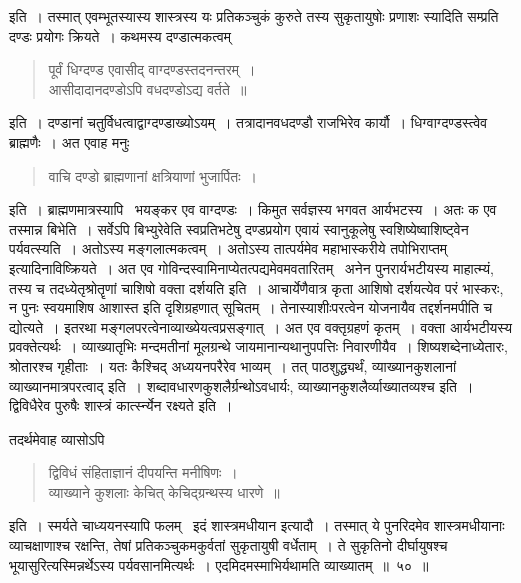 \documentclass[11pt, openany]{book}
\begin{document}
\newpage


\noindent इति~। तस्मात् एवम्भूतस्यास्य शास्त्रस्य यः प्रतिकञ्चुकं कुरुते तस्य सुकृतायुषोः प्रणाशः स्यादिति सम्प्रति दण्डः प्रयोगः क्रियते~। कथमस्य दण्डात्मकत्वम्\textendash 

\begin{quote}
{\qt पूर्वं धिग्दण्ड एवासीद् वाग्दण्डस्तदनन्तरम्~।\\
आसीदादानदण्डोऽपि वधदण्डोऽद्य वर्तते~॥}
\end{quote}

\noindent इति~। दण्डानां चतुर्विधत्वाद्वाग्दण्डाख्योऽयम्~। तत्रादानवधदण्डौ राजभिरेव कार्यौ~। धिग्वाग्दण्डस्त्वेव ब्राह्मणैः~। अत एवाह मनुः\textendash  
\begin{quote}
{\qt वाचि दण्डो ब्राह्मणानां क्षत्रियाणां भुजार्पितः~।}
\end{quote} 

\noindent इति~। ब्राह्मणमात्रस्यापि \textendash\ भयङ्कर एव वाग्दण्डः~। किमुत सर्वज्ञस्य भगवत आर्यभटस्य~। अतः क एव तस्मान्न बिभेति~। सर्वेऽपि बिभ्युरेवेति स्वप्रतिभटेषु दण्डप्रयोग एवायं स्वानुकूलेषु स्वशिष्येष्वाशिष्ट्वेन पर्यवत्स्यति~। अतोऽस्य मङ्गलात्मकत्वम्~। अतोऽस्य तात्पर्यमेव महाभास्करीये {\qt तपोभिराप्तम्} इत्यादिनाविष्क्रियते~। अत एव गोविन्दस्वामिनाप्येतत्पद्यमेवमवतारितम् \textendash\ {\qt अनेन पुनरार्यभटीयस्य
माहात्म्यं, तस्य च तदध्येतृश्रोतॄणां चाशिषो वक्ता दर्शयति} इति~। आचार्येणैवात्र कृता आशिषो दर्शयत्येव परं भास्करः, न पुनः स्वयमाशिष आशास्त इति दृशिग्रहणात् सूचितम्~। तेनास्याशीःपरत्वेन योजनायैव तद्दर्शनमपीति च द्योत्यते~। इतरथा मङ्गलपरत्वेनाव्याख्येयत्वप्रसङ्गात्~। अत
एव वक्तृग्रहणं कृतम्~। वक्ता आर्यभटीयस्य प्रवक्तेत्यर्थः~। व्याख्यातृभिः मन्दमतीनां मूलग्रन्थे जायमानान्यथानुपपत्तिः निवारणीयैव~। शिष्यशब्देनाध्येतारः, श्रोतारश्च गृहीताः~। यतः कैश्चिद् अध्ययनपरैरेव भाव्यम्~। तत् पाठशुद्ध्यर्थं, व्याख्यानकुशलानां व्याख्यानमात्रपरत्वाद्
इति~। शब्दावधारणकुशलैर्ग्रन्थोऽवधार्यः, व्याख्यानकुशलैर्व्याख्यातव्यश्च इति~। द्विविधैरेव पुरुषैः शास्त्रं कार्त्स्न्येन रक्ष्यते इति~।
\newpage

\noindent तदर्थमेवाह व्यासोऽपि\textendash 
\begin{quote}
{\qt द्विविधं संहिताज्ञानं दीपयन्ति मनीषिणः~।\\
व्याख्याने कुशलाः केचित् केचिद्ग्रन्थस्य धारणे~॥}
\end{quote}

\noindent इति~। स्मर्यते चाध्ययनस्यापि फलम् \textendash\ {\qt इदं शास्त्रमधीयान इत्यादौ}~। तस्मात् ये पुनरिदमेव शास्त्रमधीयानाः व्याचक्षाणाश्च रक्षन्ति, तेषां प्रतिकञ्चुकमकुर्वतां सुकृतायुषी वर्धेताम्~। ते सुकृतिनो दीर्घायुषश्च भूयासुरित्यस्मिन्नर्थेऽस्य पर्यवसानमित्यर्थः~। एदमिदमस्माभिर्यथामति व्याख्यातम्~॥~५०~॥
	
\end{document}
